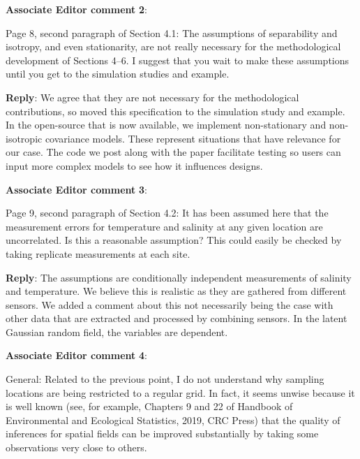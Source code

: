 \documentclass[a4paper]{article}
\def\aecom{\textbf{Associate Editor comment }}
\def\reply{\textbf{Reply}}
\begin{document}
\vspace{5mm}
\noindent \aecom \textbf{2}:

Page 8, second paragraph of Section 4.1: The assumptions of separability and isotropy, and even stationarity, are not really necessary for the methodological development of Sections 4–6. I suggest that you wait to make these assumptions until you get to the simulation studies and example.\par

\reply: We agree that they are not necessary for the methodological contributions, so moved this specification to the simulation study and example. 
In the open-source that is now available, we implement non-stationary and non-isotropic covariance models. These represent situations that have relevance for our case. The code we post along with the paper facilitate testing so users can input more complex models to see how it influences designs. 

\vspace{1em}

\vspace{5mm}
\noindent \aecom \textbf{3}:

Page 9, second paragraph of Section 4.2: It has been assumed here that the measurement errors for temperature and salinity at any given location are uncorrelated. Is this a reasonable assumption? This could easily be checked by taking replicate measurements at each site.\par

\reply: The assumptions are conditionally independent measurements of salinity and temperature. We believe this is realistic as they are gathered from different sensors. We added a comment about this not necessarily being the case with other data that are extracted and processed by combining sensors. In the latent Gaussian random field, the variables are dependent. 

\vspace{1em}

\vspace{5mm}
\noindent \aecom \textbf{4}:

General: Related to the previous point, I do not understand why sampling locations are being restricted to a regular grid. In fact, it seems unwise because it is well known (see, for example, Chapters 9 and 22 of Handbook of Environmental and Ecological Statistics, 2019, CRC Press) that the quality of inferences for spatial fields can be improved substantially by taking some
observations very close to others.\par
\end{document}
